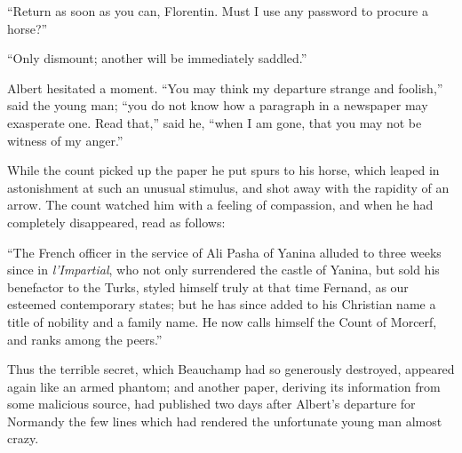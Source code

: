 “Return as soon as you can, Florentin. Must I use any password to
procure a horse?”

“Only dismount; another will be immediately saddled.”

Albert hesitated a moment. “You may think my departure strange and
foolish,” said the young man; “you do not know how a paragraph in a
newspaper may exasperate one. Read that,” said he, “when I am gone,
that you may not be witness of my anger.”

While the count picked up the paper he put spurs to his horse, which
leaped in astonishment at such an unusual stimulus, and shot away with
the rapidity of an arrow. The count watched him with a feeling of
compassion, and when he had completely disappeared, read as follows:

“The French officer in the service of Ali Pasha of Yanina alluded to
three weeks since in \textit{l’Impartial}, who not only surrendered the castle
of Yanina, but sold his benefactor to the Turks, styled himself truly
at that time Fernand, as our esteemed contemporary states; but he has
since added to his Christian name a title of nobility and a family
name. He now calls himself the Count of Morcerf, and ranks among the
peers.”

Thus the terrible secret, which Beauchamp had so generously destroyed,
appeared again like an armed phantom; and another paper, deriving its
information from some malicious source, had published two days after
Albert’s departure for Normandy the few lines which had rendered the
unfortunate young man almost crazy.
